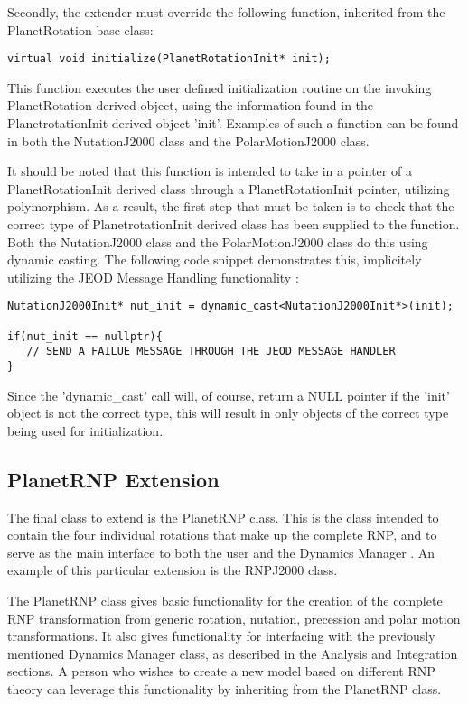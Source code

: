 Secondly, the extender must override the following function, inherited from the
PlanetRotation base class:

\begin{verbatim}
virtual void initialize(PlanetRotationInit* init);
\end{verbatim}

This function executes the user defined initialization routine on the
invoking PlanetRotation derived object, using the information found in the
PlanetrotationInit derived object 'init'. Examples of such a function can be
found in both the NutationJ2000 class and the PolarMotionJ2000 class.

It should be noted that this function is intended to take in a pointer of
a PlanetRotationInit derived class through a PlanetRotationInit pointer,
utilizing polymorphism. As a result, the first step that must be taken is
to check that the correct type of PlanetrotationInit derived class has been
supplied to the function. Both the NutationJ2000 class and the
PolarMotionJ2000 class do this using dynamic casting. The following
code snippet demonstrates this, implicitely utilizing the JEOD
Message Handling functionality \cite{dynenv:MESSAGE}:

\begin{verbatim}
NutationJ2000Init* nut_init = dynamic_cast<NutationJ2000Init*>(init);

if(nut_init == nullptr){
   // SEND A FAILUE MESSAGE THROUGH THE JEOD MESSAGE HANDLER
}
\end{verbatim}

Since the 'dynamic\_cast' call will, of course, return a NULL pointer if the
'init' object is not the correct type, this will result in only objects
of the correct type being used for initialization.


\subsection{PlanetRNP Extension}

The final class to extend is the PlanetRNP class. This is the class intended
to contain the four individual rotations that make up the complete RNP,
and to serve as the main interface to both the user and the Dynamics
Manager \cite{dynenv:DYNMANAGER}. An example of this particular extension
is the RNPJ2000 class.

The PlanetRNP class gives basic functionality for the creation of the
complete RNP transformation from generic rotation, nutation, precession
and polar motion transformations. It also gives functionality for
interfacing with the previously mentioned Dynamics Manager class, as described
in the Analysis and Integration sections. A person who wishes to create
a new model based on different RNP theory can leverage this functionality by
inheriting from the PlanetRNP class.

